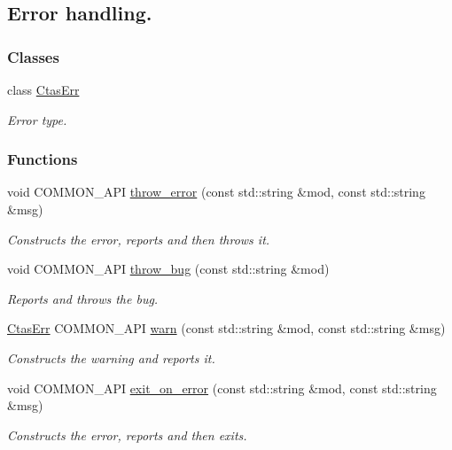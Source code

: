 \hypertarget{group__Error}{
\subsection{Error handling.}
\label{group__Error}
}
\subsubsection*{Classes}
\begin{DoxyCompactItemize}
\item 
class \hyperlink{classCtasErr}{CtasErr}
\begin{DoxyCompactList}\small\item\em Error type. \item\end{DoxyCompactList}\end{DoxyCompactItemize}
\subsubsection*{Functions}
\begin{DoxyCompactItemize}
\item 
void COMMON\_\-API \hyperlink{group__Error_gaad605c8e899cb915d214127c18a12157}{throw\_\-error} (const std::string \&mod, const std::string \&msg)
\begin{DoxyCompactList}\small\item\em Constructs the error, reports and then throws it. \item\end{DoxyCompactList}\item 
void COMMON\_\-API \hyperlink{group__Error_gacb8a74cf255f5788357a30ce8b4f80db}{throw\_\-bug} (const std::string \&mod)
\begin{DoxyCompactList}\small\item\em Reports and throws the bug. \item\end{DoxyCompactList}\item 
\hyperlink{classCtasErr}{CtasErr} COMMON\_\-API \hyperlink{group__Error_gafc17a83d686f911fcbed38f9b4b4fda4}{warn} (const std::string \&mod, const std::string \&msg)
\begin{DoxyCompactList}\small\item\em Constructs the warning and reports it. \item\end{DoxyCompactList}\item 
void COMMON\_\-API \hyperlink{group__Error_ga9ddf0cafadd98ea5e8558558b8d6dfb5}{exit\_\-on\_\-error} (const std::string \&mod, const std::string \&msg)
\begin{DoxyCompactList}\small\item\em Constructs the error, reports and then exits. \item\end{DoxyCompactList}\end{DoxyCompactItemize}


